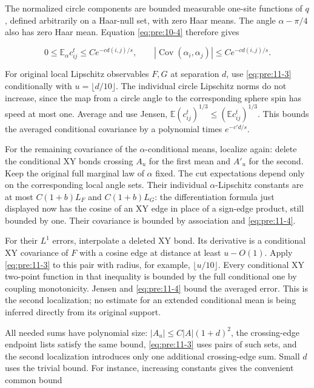 The normalized circle components are bounded measurable one-site functions of \(q\), defined arbitrarily on a Haar-null set, with zero Haar means. The angle \(\alpha-\pi/4\) also has zero Haar mean. Equation \eqref{eq:pre:10-4} therefore gives

\begin{equation}
0\leq\mathbb E_\alpha c^t_{ij}\leq Ce^{-cd(i,j)/s},\qquad
|\operatorname{Cov}(\alpha_i,\alpha_j)|\leq Ce^{-cd(i,j)/s}.
\label{eq:pre:11-4}
\end{equation}

For original local Lipschitz observables \(F,G\) at separation \(d\), use \eqref{eq:pre:11-3} conditionally with \(u=\lfloor d/10\rfloor\). The individual circle Lipschitz norms do not increase, since the map from a circle angle to the corresponding sphere spin has speed at most one. Average and use Jensen,
\(\mathbb E(c^t_{ij})^{1/3}\leq(\mathbb E c^t_{ij})^{1/3}\).
This bounds the averaged conditional covariance by a polynomial times \(e^{-c'd/s}\).

For the remaining covariance of the \(\alpha\)-conditional means, localize again: delete the conditional XY bonds crossing \(A_u\) for the first mean and \(A'_u\) for the second. Keep the original full marginal law of \(\alpha\) fixed. The cut expectations depend only on the corresponding local angle sets. Their individual \(\alpha\)-Lipschitz constants are at most \(C(1+b)L_F\) and \(C(1+b)L_G\): the differentiation formula just displayed now has the cosine of an XY edge in place of a sign-edge product, still bounded by one. Their covariance is bounded by association and \eqref{eq:pre:11-4}.

For their \(L^1\) errors, interpolate a deleted XY bond. Its derivative is a conditional XY covariance of \(F\) with a cosine edge at distance at least \(u-O(1)\). Apply \eqref{eq:pre:11-3} to this pair with radius, for example, \(\lfloor u/10\rfloor\). Every conditional XY two-point function in that inequality is bounded by the full conditional one by coupling monotonicity. Jensen and \eqref{eq:pre:11-4} bound the averaged error. This is the second localization; no estimate for an extended conditional mean is being inferred directly from its original support.

All needed sums have polynomial size: \(|A_u|\leq C|A|(1+d)^2\), the crossing-edge endpoint lists satisfy the same bound, \eqref{eq:pre:11-3} uses pairs of such sets, and the second localization introduces only one additional crossing-edge sum. Small \(d\) uses the trivial bound. For instance, increasing constants gives the convenient common bound

